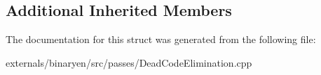 \subsection*{Additional Inherited Members}


The documentation for this struct was generated from the following file\+:\begin{DoxyCompactItemize}
\item 
externals/binaryen/src/passes/Dead\+Code\+Elimination.\+cpp\end{DoxyCompactItemize}
